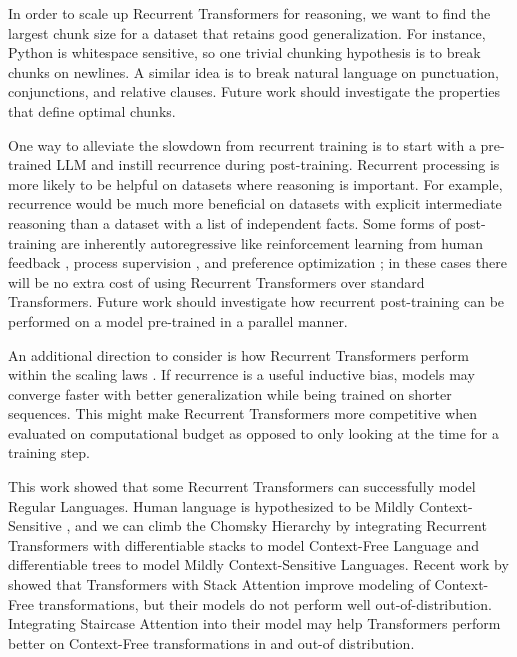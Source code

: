     In order to scale up Recurrent Transformers for reasoning, we want to find the largest chunk size for a dataset that retains good generalization. For instance, Python is whitespace sensitive, so one trivial chunking hypothesis is to break chunks on newlines. A similar idea is to break natural language on punctuation, conjunctions, and relative clauses. Future work should investigate the properties that define optimal chunks.
    
    One way to alleviate the slowdown from recurrent training is to start with a pre-trained LLM and instill recurrence during post-training. Recurrent processing is more likely to be helpful on datasets where reasoning is important. For example, recurrence would be much more beneficial on datasets with explicit intermediate reasoning \citep{nye_show_2021, wei_chain_2022} than a dataset with a list of independent facts. Some forms of post-training are inherently autoregressive like reinforcement learning from human feedback \citep{christiano_deep_2017}, process supervision \citep{lightman_lets_2024}, and preference optimization \citep{pang_iterative_2024}; in these cases there will be no extra cost of using Recurrent Transformers over standard Transformers. Future work should investigate how recurrent post-training can be performed on a model pre-trained in a parallel manner.
    
    An additional direction to consider is how Recurrent Transformers perform within the scaling laws \citep{kaplan_scaling_2020, hoffmann_training_2022}. If recurrence is a useful inductive bias, models may converge faster with better generalization while being trained on shorter sequences. This might make Recurrent Transformers more competitive when evaluated on computational budget as opposed to only looking at the time for a training step.
    
    This work showed that some Recurrent Transformers can successfully model Regular Languages. Human language is hypothesized to be Mildly Context-Sensitive \citep{joshi_tree_1985, joshi_convergence_1990}, and we can climb the Chomsky Hierarchy \citep{chomsky_three_1956, chomsky_certain_1959} by integrating Recurrent Transformers with differentiable stacks \citep{joulin_inferring_2015, grefenstette2015learning} to model Context-Free Language and differentiable trees \citep{pmlr-v202-soulos23a} to model Mildly Context-Sensitive Languages. Recent work by \citet{dusell2024stack} showed that Transformers with Stack Attention improve modeling of Context-Free transformations, but their models do not perform well out-of-distribution. Integrating Staircase Attention into their model may help Transformers perform better on Context-Free transformations in and out-of distribution.
    